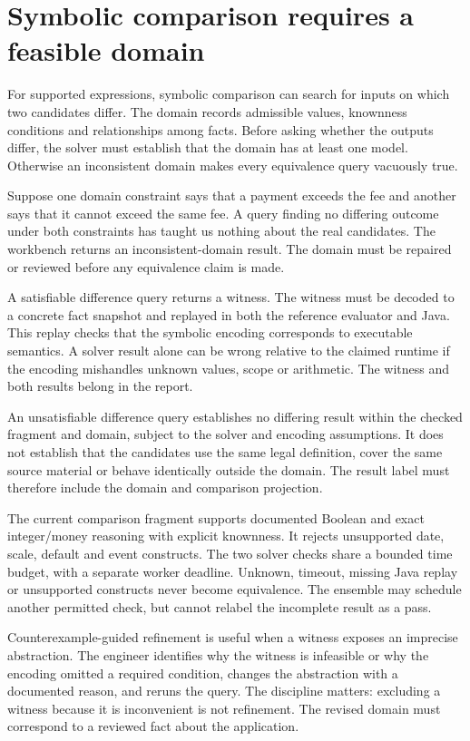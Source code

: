 \section{Symbolic comparison requires a feasible domain}

For supported expressions, symbolic comparison can search for inputs on which two
candidates differ. The domain records admissible values, knownness conditions and
relationships among facts. Before asking whether the outputs differ, the solver
must establish that the domain has at least one model. Otherwise an inconsistent
domain makes every equivalence query vacuously true.

Suppose one domain constraint says that a payment exceeds the fee and another
says that it cannot exceed the same fee. A query finding no differing outcome
under both constraints has taught us nothing about the real candidates. The
workbench returns an inconsistent-domain result. The domain must be repaired or
reviewed before any equivalence claim is made.

A satisfiable difference query returns a witness. The witness must be decoded to
a concrete fact snapshot and replayed in both the reference evaluator and Java.
This replay checks that the symbolic encoding corresponds to executable semantics.
A solver result alone can be wrong relative to the claimed runtime if the
encoding mishandles unknown values, scope or arithmetic. The witness and both
results belong in the report.

An unsatisfiable difference query establishes no differing result within the
checked fragment and domain, subject to the solver and encoding assumptions. It
does not establish that the candidates use the same legal definition, cover the
same source material or behave identically outside the domain. The result label
must therefore include the domain and comparison projection.

The current comparison fragment supports documented Boolean and exact
integer/money reasoning with explicit knownness. It rejects unsupported date,
scale, default and event constructs. The two solver checks share a bounded time
budget, with a separate worker deadline. Unknown, timeout, missing Java replay or
unsupported constructs never become equivalence. The ensemble may schedule
another permitted check, but cannot relabel the incomplete result as a pass.

Counterexample-guided refinement is useful when a witness exposes an imprecise
abstraction. The engineer identifies why the witness is infeasible or why the
encoding omitted a required condition, changes the abstraction with a documented
reason, and reruns the query. The discipline matters: excluding a witness because
it is inconvenient is not refinement. The revised domain must correspond to a
reviewed fact about the application.

